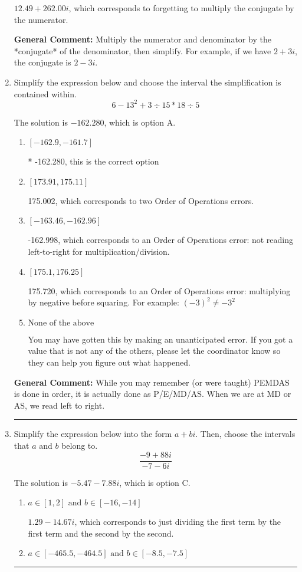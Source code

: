\documentclass{extbook}[14pt]
\newcommand{\litem}[1]{\item #1

\rule{\textwidth}{0.4pt}}
\begin{document}
\begin{enumerate}
{\begin{enumerate}[label=\Alph*.]
 $12.49  + 262.00 i$, which corresponds to forgetting to multiply the conjugate by the numerator.
\end{enumerate}

\textbf{General Comment:} Multiply the numerator and denominator by the *conjugate* of the denominator, then simplify. For example, if we have $2+3i$, the conjugate is $2-3i$.
}
\litem{
Simplify the expression below and choose the interval the simplification is contained within.
\[ 6 - 13^2 + 3 \div 15 * 18 \div 5 \]

The solution is \( -162.280 \), which is option A.\begin{enumerate}[label=\Alph*.]
\item \( [-162.9, -161.7] \)

* -162.280, this is the correct option
\item \( [173.91, 175.11] \)

 175.002, which corresponds to two Order of Operations errors.
\item \( [-163.46, -162.96] \)

 -162.998, which corresponds to an Order of Operations error: not reading left-to-right for multiplication/division.
\item \( [175.1, 176.25] \)

 175.720, which corresponds to an Order of Operations error: multiplying by negative before squaring. For example: $(-3)^2 \neq -3^2$
\item \( \text{None of the above} \)

 You may have gotten this by making an unanticipated error. If you got a value that is not any of the others, please let the coordinator know so they can help you figure out what happened.
\end{enumerate}

\textbf{General Comment:} While you may remember (or were taught) PEMDAS is done in order, it is actually done as P/E/MD/AS. When we are at MD or AS, we read left to right.
}
\litem{
Simplify the expression below into the form $a+bi$. Then, choose the intervals that $a$ and $b$ belong to.
\[ \frac{-9 + 88 i}{-7 - 6 i} \]

The solution is \( -5.47  - 7.88 i \), which is option C.\begin{enumerate}[label=\Alph*.]
\item \( a \in [1, 2] \text{ and } b \in [-16, -14] \)

 $1.29  - 14.67 i$, which corresponds to just dividing the first term by the first term and the second by the second.
\item \( a \in [-465.5, -464.5] \text{ and } b \in [-8.5, -7.5] \)


\end{enumerate}}
\end{enumerate}
\end{document}
